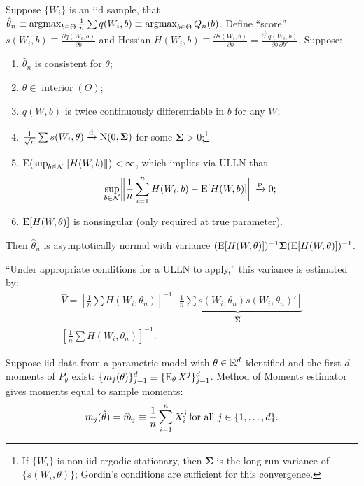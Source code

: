\documentclass[8pt,letterpaper, landscape]{extarticle} %
\newcommand{\mSigma}{\ensuremath{\mathbf{\Sigma}}}
\begin{document}
\begin{multicols}{3}
\begin{description}
 Suppose $ \{ W_i \} $ is an iid sample, that $ \hat{\theta}_n \equiv \operatorname*{argmax}_{b \in \Theta} \tfrac{1}{n} \sum q(W_i, b) \equiv \operatorname*{argmax}_{b \in \Theta} Q_n(b) $. Define ``score'' $ s(W_i, b) \equiv \frac{\partial q (W_i, b)}{\partial b} $ and Hessian $ H(W_i, b) \equiv \frac{\partial s (W_i, b)}{\partial b} = \frac{\partial^2 q (W_i, b)}{\partial b \, \partial b'} $. Suppose:
\begin{enumerate}
\item $ \hat{\theta}_n $ is consistent for $ \theta $;
\item $ \theta \in \operatorname{interior} (\Theta) $;
\item $ q(W,b) $ is twice continuously differentiable in $ b $ for any $ W $;
\item $ \frac{1}{\sqrt{n}} \sum s(W_i, \theta) \xrightarrow{\text{d}} \n (0, \mSigma) $ for some $ \mSigma > 0 $;\footnote{If $ \{ W_i \} $ is non-iid ergodic stationary, then $ \mSigma $ is the long-run variance of $ \{ s(W_i, \theta) \} $; Gordin's conditions are sufficient for this convergence.}
\item $ \operatorname{E} ( \sup_{b \in \mathcal{N}} \lVert H(W, b) \rVert ) < \infty $, which implies via ULLN that
$$ \sup_{b \in \mathcal{N}} \biggl \lVert \frac{1}{n} \sum_{i=1}^{n} H(W_i, b) - \operatorname{E} [H(W, b)] \biggr \rVert \xrightarrow{\text{p}} 0 ; $$
\item $ \operatorname{E} [H(W, \theta)] $ is nonsingular (only required at true parameter).
\end{enumerate}
Then $ \hat{\theta}_n $ is asymptotically normal with variance $ ( \E [H(W, \theta)])^{-1} \mSigma ( \E [H(W, \theta)])^{-1} $.

``Under appropriate conditions for a ULLN to apply,'' this variance is estimated by:
\begin{multline*}
\widehat{V} = \left[ \tfrac{1}{n} \sum H(W_i, \theta_n) \right]^{-1}
\underbrace{\left[ \tfrac{1}{n} \sum s(W_i, \theta_n) s(W_i, \theta_n)' \right]}_{\widehat{\mSigma}} \\
\left[ \tfrac{1}{n} \sum H(W_i, \theta_n) \right]^{-1}.
\end{multline*}

 Suppose iid data from a parametric model with $ \theta \in \mathbb{R}^d $ identified and the first $ d $ moments of $ P_\theta $ exist: $ \{m_j(\theta) \}_{j=1}^{d} \equiv \{\operatorname{E}_\theta X^j \}_{j=1}^{d} $. Method of Moments estimator gives moments equal to sample moments:
$$ m_j(\hat{\theta}) = \widehat{m}_j \equiv \frac{1}{n} \sum_{i=1}^{n} X_i^j \, \text{for all $ j \in \{1, \dotsc , d \} $.}  $$


\end{description}
\end{multicols}
\end{document}
